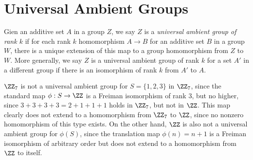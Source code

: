 \section{Universal Ambient Groups}

Gien an additive set $A$ in a group $Z$, we say $Z$ is a \emph{universal ambient group of rank $k$} if for each rank $k$ homomorphism $A \to B$ for an additive set $B$ in a group $W$, there is a unique extension of this map to a group homomorphism from $Z$ to $W$. More generally, we say $Z$ is a universal ambient group of rank $k$ for a set $A'$ in a different group if there is an isomorphism of rank $k$ from $A'$ to $A$.

\begin{example}
    $\ZZ_7$ is not a universal ambient group for $S = \{ 1, 2, 3 \}$ in $\ZZ_7$, since the standard map $\phi: S \to \ZZ$ is a Freiman isomorphism of rank 3, but no higher, since $3 + 3 + 3 + 3 = 2 + 1 + 1 + 1$ holds in $\ZZ_7$, but not in $\ZZ$. This map clearly does not extend to a homomorphism from $\ZZ_7$ to $\ZZ$, since no nonzero homomorphism of this type exists. On the other hand, $\ZZ$ is also not a universal ambient group for $\phi(S)$, since the translation map $\phi(n) = n + 1$ is a Freiman isomorphism of arbitrary order but does not extend to a homomorphism from $\ZZ$ to itself.
\end{example}

